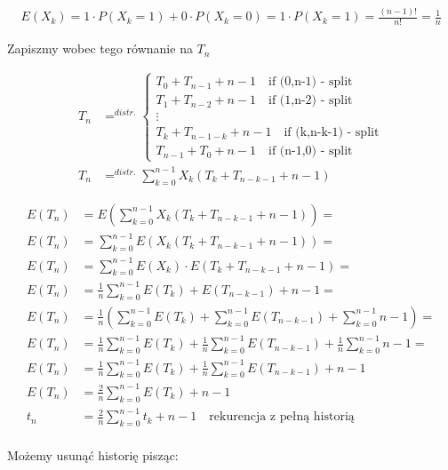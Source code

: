 \documentclass{article}
\begin{document}
\begin{align}
    E(X_k) = 1\cdot P(X_k=1) + 0\cdot P(X_k=0) = 1\cdot P(X_k=1) = \frac{(n-1)!}{n!} = \frac{1}{n}
\end{align}

Zapiszmy wobec tego równanie na $T_n$

\begin{align}
    T_n &=^{distr.} \begin{cases}
        T_0 + T_{n-1} + n-1 \quad \text{if (0,n-1) - split}\\
        T_1 + T_{n-2} + n-1 \quad \text{if (1,n-2) - split}\\
        \vdots\\
        T_k + T_{n-1-k} + n - 1 \quad \text{if (k,n-k-1) - split}\\
        T_{n-1} + T_{0} + n - 1 \quad \text{if (n-1,0) - split}
    \end{cases}\\
    T_n &=^{distr.} \sum_{k=0}^{n-1} X_k(T_k+T_{n-k-1} + n-1)
\end{align}

\begin{align}
    E(T_n) &= E\left(\sum_{k=0}^{n-1} X_k(T_k+T_{n-k-1} + n-1)\right)=\\
    E(T_n) &= \sum_{k=0}^{n-1} E\left(X_k(T_k+T_{n-k-1} + n-1)\right)=\\
    E(T_n) &= \sum_{k=0}^{n-1} E\left(X_k\right) \cdot E(T_k+T_{n-k-1} + n-1)=\\
    E(T_n) &= \frac{1}{n} \sum_{k=0}^{n-1} E(T_k) + E(T_{n-k-1}) + n-1=\\
    E(T_n) &= \frac{1}{n} \left(\sum_{k=0}^{n-1} E(T_k) + \sum_{k=0}^{n-1} E(T_{n-k-1}) + \sum_{k=0}^{n-1} n-1\right)=\\
    E(T_n) &= \frac{1}{n} \sum_{k=0}^{n-1} E(T_k) + \frac{1}{n} \sum_{k=0}^{n-1} E(T_{n-k-1}) + \frac{1}{n} \sum_{k=0}^{n-1} n-1 = \\
    E(T_n) &= \frac{1}{n} \sum_{k=0}^{n-1} E(T_k) + \frac{1}{n} \sum_{k=0}^{n-1} E(T_{n-k-1}) + n - 1\\
    E(T_n) &= \frac{2}{n} \sum_{k=0}^{n-1} E(T_k) + n - 1\\
    t_n &= \frac{2}{n} \sum_{k=0}^{n-1} t_k + n - 1 \quad \text{rekurencja z pełną historią}\\
\end{align}

Możemy usunąć historię pisząc:
\end{document}
